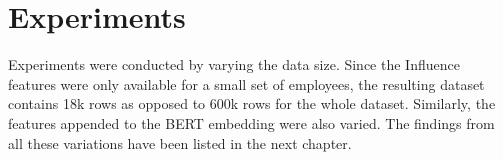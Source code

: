 \section{Experiments}

Experiments were conducted by varying the data size. Since the Influence features were only available for a small set of employees, the resulting dataset contains 18k rows as opposed to 600k rows for the whole dataset. Similarly, the features appended to the BERT embedding were also varied. The findings from all these variations have been listed in the next chapter.

